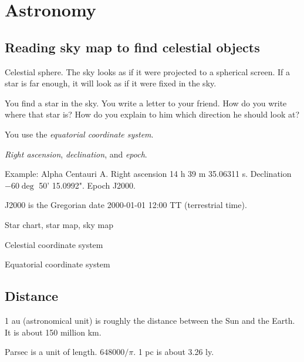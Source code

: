 \chapter{Astronomy}

\section{Reading sky map to find celestial objects}


Celestial sphere.
The sky looks as if it were projected to a spherical screen.
If a star is far enough, it will look as if it were fixed in the sky.

You find a star in the sky.
You write a letter to your friend.
How do you write where that star is?
How do you explain to him which direction he should look at?

You use the \emph{equatorial coordinate system}.

\emph{Right ascension}, \emph{declination}, and \emph{epoch}.

Example: Alpha Centauri A.
Right ascension 14 h 39 m 35.06311 s.
Declination \(-60\deg\) 50' 15.0992".
Epoch J2000.

J2000 is the Gregorian date 2000-01-01 12:00 TT (terrestrial time).

Star chart, star map, sky map


Celestial coordinate system



Equatorial coordinate system


\section{Distance}


1 au (astronomical unit) is roughly the distance between the Sun and the Earth.
It is about 150 million km.

Parsec is a unit of length.
\( 648000/\pi \).
1 pc is about 3.26 ly.

